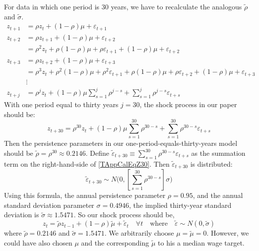 \documentclass[letterpaper,12pt]{article}
\theoremstyle{definition}
\newcommand\ve{\varepsilon}
\begin{document}
  For data in which one period is 30 years, we have to recalculate the analogous $\tilde{\rho}$ and $\tilde{\sigma}$.
  \begin{equation*}\label{TAppCalEqZtpj}
    \begin{split}
      z_{t+1} &= \rho z_{t} + (1-\rho)\mu + \ve_{t+1} \\
      z_{t+2} &= \rho z_{t+1} + (1-\rho)\mu + \ve_{t+2} \\
              &= \rho^2 z_{t} + \rho(1-\rho)\mu + \rho\ve_{t+1} + (1-\rho)\mu + \ve_{t+2} \\
      z_{t+3} &= \rho z_{t+2} + (1-\rho)\mu + \ve_{t+3} \\
              &= \rho^3 z_{t} + \rho^2(1-\rho)\mu + \rho^2\ve_{t+1} + \rho(1-\rho)\mu + \rho\ve_{t+2} + (1-\rho)\mu + \ve_{t+3} \\
              &\vdots \\
      z_{t+j} &= \rho^{j}z_{t} + (1-\rho)\mu\sum_{s=1}^{j}\rho^{j-s} + \sum_{s=1}^{j}\rho^{j-s}\ve_{t+s}
    \end{split}
  \end{equation*}
  With one period equal to thirty years $j=30$, the shock process in our paper should be:
  \begin{equation}\label{TAppCalEqZ30}
    z_{t+30} = \rho^{30}z_{t} + (1-\rho)\mu\sum_{s=1}^{30}\rho^{30-s} + \sum_{s=1}^{30}\rho^{30-s}\ve_{t+s}
  \end{equation}
  Then the persistence parameters in our one-period-equals-thirty-years model should be $\tilde{\rho}=\rho^{30}\approx 0.2146$. Define $\tilde{\ve}_{t+30}\equiv\sum_{s=1}^{30}\rho^{30-s}\ve_{t+s}$ as the summation term on the right-hand-side of \eqref{TAppCalEqZ30}. Then $\tilde{\ve}_{t+30}$ is distributed:
  \begin{equation*}\label{TAppCalEqEps30dist}
    \tilde{\ve}_{t+30}\sim N\Biggl(0,\left[\sum_{s=1}^{30}\rho^{30-s}\right]\sigma\Biggr)
  \end{equation*}
  Using this formula, the annual persistence parameter $\rho=0.95$, and the annual standard deviation parameter $\sigma=0.4946$, the implied thirty-year standard deviation is $\tilde{\sigma}\approx 1.5471$. So our shock process should be,
  \begin{equation*}\label{TAppCalEqZ30cal}
    z_t = \tilde{\rho}z_{t-1} + (1-\rho)\tilde{\mu} + \tilde{\ve}_t \quad\forall t \quad\text{where}\quad \tilde{\ve}\sim N(0,\tilde{\sigma})
  \end{equation*}
  where $\tilde{\rho}=0.2146$ and $\tilde{\sigma}=1.5471$. We arbitrarily choose $\mu=\tilde{\mu}=0$. However, we could have also chosen $\mu$ and the corresponding $\tilde{\mu}$ to his a median wage target.
\end{document}
